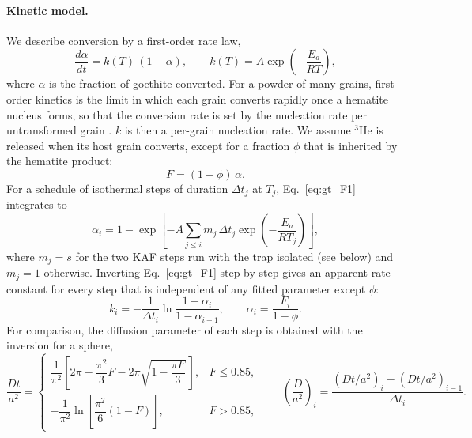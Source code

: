\paragraph{Kinetic model.} We describe conversion by a first-order rate law,
\begin{equation}
  \frac{d\alpha}{dt} = k(T)\,(1-\alpha),
  \qquad
  k(T) = A\exp\!\left(-\frac{E_a}{RT}\right),
  \label{eq:gt_F1}
\end{equation}
where $\alpha$ is the fraction of goethite converted. For a powder of many grains, first-order
kinetics is the limit in which each grain converts rapidly once a hematite nucleus forms, so
that the conversion rate is set by the nucleation rate per untransformed grain
\citep{mampel1940}. $k$ is then a per-grain nucleation rate. We assume $^3$He is released when
its host grain converts, except for a fraction $\phi$ that is inherited by the hematite
product:
\begin{equation}
  F = (1-\phi)\,\alpha .
  \label{eq:gt_Fphi}
\end{equation}
For a schedule of isothermal steps of duration $\Delta t_j$ at $T_j$, Eq.~\ref{eq:gt_F1}
integrates to
\begin{equation}
  \alpha_i = 1 - \exp\!\left[-A\sum_{j\le i} m_j\,\Delta t_j \exp\!\left(-\frac{E_a}{RT_j}\right)\right],
  \label{eq:gt_F1_cum}
\end{equation}
where $m_j = s$ for the two KAF steps run with the trap isolated (see below) and $m_j=1$
otherwise. Inverting Eq.~\ref{eq:gt_F1} step by step gives an apparent rate constant for every
step that is independent of any fitted parameter except $\phi$:
\begin{equation}
  k_i = -\frac{1}{\Delta t_i}\ln\frac{1-\alpha_i}{1-\alpha_{i-1}},
  \qquad \alpha_i = \frac{F_i}{1-\phi}.
  \label{eq:gt_stepk}
\end{equation}
For comparison, the diffusion parameter of each step is obtained with the
\citet{fechtig1966} inversion for a sphere,
\begin{equation}
  \frac{Dt}{a^2} =
  \begin{cases}
    \dfrac{1}{\pi^2}\left[2\pi - \dfrac{\pi^2}{3}F - 2\pi\sqrt{1-\dfrac{\pi F}{3}}\,\right], & F \le 0.85,\\[2ex]
    -\dfrac{1}{\pi^2}\ln\!\left[\dfrac{\pi^2}{6}(1-F)\right], & F > 0.85,
  \end{cases}
  \qquad
  \left(\frac{D}{a^2}\right)_i = \frac{(Dt/a^2)_i - (Dt/a^2)_{i-1}}{\Delta t_i}.
  \label{eq:gt_FK}
\end{equation}

